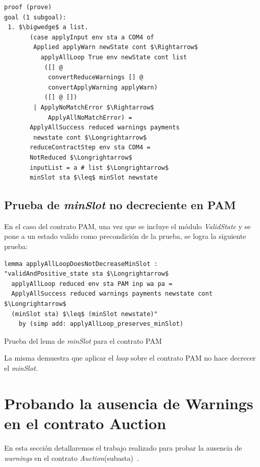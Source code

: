\documentclass[12pt]{book}
\begin{document}
\begin{lstlisting}[style=Isabelle]
proof (prove)
goal (1 subgoal):
 1. $\bigwedge$ a list.
       (case applyInput env sta a COM4 of
        Applied applyWarn newState cont $\Rightarrow$
          applyAllLoop True env newState cont list
           ([] @
            convertReduceWarnings [] @
            convertApplyWarning applyWarn)
           ([] @ [])
        | ApplyNoMatchError $\Rightarrow$
            ApplyAllNoMatchError) =
       ApplyAllSuccess reduced warnings payments
        newstate cont $\Longrightarrow$
       reduceContractStep env sta COM4 =
       NotReduced $\Longrightarrow$
       inputList = a # list $\Longrightarrow$
       minSlot sta $\leq$ minSlot newstate
\end{lstlisting}

\subsection{Prueba de \textit{minSlot} no decreciente en PAM}

En el caso del contrato PAM, una vez que se incluye el módulo \textit{ValidState} y se pone a un estado valido como precondición de la prueba, se logra la siguiente prueba:

\begin{table}[H]
    \centering
  \begin{lstlisting}[style=Isabelle, belowskip=-8pt]
lemma applyAllLoopDoesNotDecreaseMinSlot :
"validAndPositive_state sta $\Longrightarrow$
  applyAllLoop reduced env sta PAM inp wa pa = 
  ApplyAllSuccess reduced warnings payments newstate cont $\Longrightarrow$
  (minSlot sta) $\leq$ (minSlot newstate)"
    by (simp add: applyAllLoop_preserves_minSlot)
\end{lstlisting}
  \caption{\label{tab:my_label}Prueba del lema de \textit{minSlot} para el contrato PAM}
\end{table}

La misma demuestra que aplicar el \textit{loop} sobre el contrato PAM no hace decrecer el \textit{minSlot}.

\section{Probando la ausencia de Warnings en el contrato Auction}

En esta sección detallaremos el trabajo realizado para probar la ausencia de \textit{warnings} en el contrato \textit{Auction}(subasta)~\cite{auction_haskell}.
\end{document}
